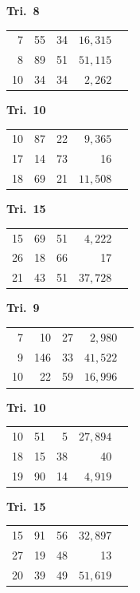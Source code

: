 \documentclass[12pt,a4paper]{article}
\theoremstyle{plain}
\theoremstyle{definition}
\theoremstyle{remark}
\begin{document}
\begin{center}
\medskip
\noindent
\begin{minipage}[t]{0.32\textwidth}
\centering
\textbf{Tri.~8}
\begin{tabular}[t]{r|r|r|r|l}
  7 & 55 & 34 & $16{,}315$ \\
  8 & 89 & 51 & $51{,}115$ \\
  10 & 34 & 34 & $2{,}262$ \\
\end{tabular}
\end{minipage}\hfill
\begin{minipage}[t]{0.32\textwidth}
\centering
\textbf{Tri.~10}
\begin{tabular}[t]{r|r|r|r|l}
  10 & 87 & 22 & $9{,}365$ \\
  17 & 14 & 73 & 16 \\
  18 & 69 & 21 & $11{,}508$ \\
\end{tabular}
\end{minipage}\hfill
\begin{minipage}[t]{0.32\textwidth}
\centering
\textbf{Tri.~15}
\begin{tabular}[t]{r|r|r|r|l}
  15 & 69 & 51 & $4{,}222$ \\
  26 & 18 & 66 & 17 \\
  21 & 43 & 51 & $37{,}728$ \\
\end{tabular}
\end{minipage}

\medskip
\noindent
\begin{minipage}[t]{0.32\textwidth}
\centering
\textbf{Tri.~9}
\begin{tabular}[t]{r|r|r|r|l}
  7 & 10 & 27 & $2{,}980$ \\
  9 & 146 & 33 & $41{,}522$ \\
  10 & 22 & 59 & $16{,}996$ \\
\end{tabular}
\end{minipage}\hfill
\begin{minipage}[t]{0.32\textwidth}
\centering
\textbf{Tri.~10}
\begin{tabular}[t]{r|r|r|r|l}
  10 & 51 & 5 & $27{,}894$ \\
  18 & 15 & 38 & 40 \\
  19 & 90 & 14 & $4{,}919$ \\
\end{tabular}
\end{minipage}\hfill
\begin{minipage}[t]{0.32\textwidth}
\centering
\textbf{Tri.~15}
\begin{tabular}[t]{r|r|r|r|l}
  15 & 91 & 56 & $32{,}897$ \\
  27 & 19 & 48 & 13 \\
  20 & 39 & 49 & $51{,}619$ \\
\end{tabular}
\end{minipage}

\end{center}
\normalsize
\end{document}
